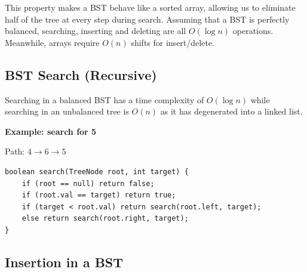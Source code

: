 This property makes a BST behave like a sorted array, allowing us to eliminate half of the tree at every step during search. Assuming that a BST is perfectly balanced, searching, inserting and deleting are all $O(\log n)$ operations. Meanwhile, arrays require $O(n)$ shifts for insert/delete.

\begin{center}
\end{center}

\subsection{BST Search (Recursive)}

Searching in a balanced BST has a time complexity of \textbf{$O(\log n)$} while searching in an unbalanced tree is $O(n)$ as it has degenerated into a linked list.

\textbf{Example: search for 5}

\begin{center}
\end{center}

Path: $4 \rightarrow 6 \rightarrow 5$

\begin{verbatim}
boolean search(TreeNode root, int target) {
    if (root == null) return false;
    if (root.val == target) return true;
    if (target < root.val) return search(root.left, target);
    else return search(root.right, target);
}
\end{verbatim}

\subsection{Insertion in a BST}


